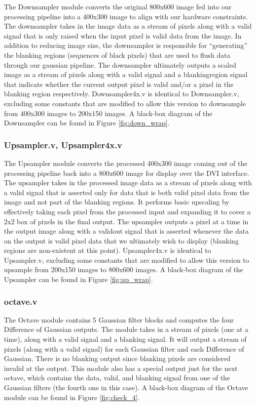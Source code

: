 The Downsampler module converts the original 800x600 image fed into our processing
pipeline into a 400x300 image to align with our hardware constraints. The downsampler
takes in the image data as a stream of pixels along with a valid signal that is
only raised when the input pixel is valid data from the image. In addition to 
reducing image size, the downsampler is responsible for ``generating'' the 
blanking regions (sequences of black pixels) that are used to flush data 
through our gaussian pipeline. The downsampler ultimately outputs a scaled 
image as a stream of pixels along with a valid signal and a blankingregion 
signal that indicate whether the current output pixel is valid and/or a pixel
in the blanking region respectively. Downsampler4x.v is identical to 
Downsampler.v, excluding some constants that are modified to allow this version 
to downsample from 400x300 images to 200x150 images. A black-box diagram of the Downsampler
can be found in Figure \ref{fig:down_wrap}.

\subsubsection{Upsampler.v, Upsampler4x.v}

The Upsampler module converts the processed 400x300 image coming out of the processing
pipeline back into a 800x600 image for display over the DVI interface. The upsampler
takes in the processed image data as a stream of pixels along with a valid signal 
that is asserted only for data that is both valid pixel data from the image and
not part of the blanking regions. It performs basic upscaling by effectively taking
each pixel from the processed input and expanding it to cover a 2x2 box of 
pixels in the final output. The upsampler outputs a pixel at a time in the output 
image along with a validout signal that is asserted whenever the data on the 
output is valid pixel data that we ultimately wish to display (blanking regions
are non-existent at this point). Upsampler4x.v is identical to Upsampler.v, 
excluding some constants that are modified to allow this version to upsample 
from 200x150 images to 800x600 images. A black-box diagram of the Upsampler
can be found in Figure \ref{fig:up_wrap}.


\subsubsection{octave.v}

The Octave module contains 5 Gaussian filter blocks and computes the four 
Difference of Gaussian outputs. The module takes in a stream of pixels (one at 
a time), along with a valid signal and a blanking signal. It will output a 
stream of pixels (along with a valid signal) for each Gaussian filter and each 
Difference of Gaussian. There is no blanking output since blanking pixels are 
considered invalid at the output. This module also has a special output just 
for the next octave, which contains the data, valid, and blanking signal from 
one of the Gaussian filters (the fourth one in this case). A black-box diagram
of the Octave module can be found in Figure \ref{fig:check_4}.

